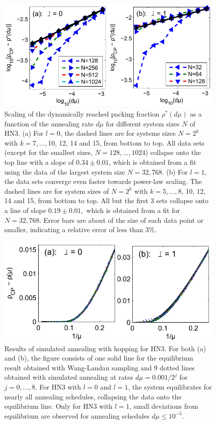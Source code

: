 \begin{figure}
\centering \includegraphics[width=0.9\columnwidth]{Chapter-2/Paper_HN3_Decay}
\protect\caption{Scaling of the dynamically reached packing fraction $\rho^{*}(d\mu)$
as a function of the annealing rate $d\mu$ for different system sizes
$N$ of HN3. (a) For $l=0$, the dashed lines are for systems sizes
$N=2^{k}$ with $k=7,\ldots,$10, 12, 14 and 15, from bottom to top.
All data sets (except for the smallest sizes, $N=128,\ldots,1024$)
collapse onto the top line with a slope of $0.34\pm0.01$, which is
obtained from a fit using the data of the largest system size $N=32,768$.
(b) For $l=1$, the data sets converge even faster towards power-law
scaling. The dashed lines are for system sizes of $N=2^{k}$ with
$k=5,\ldots,8$, 10, 12, 14 and 15, from bottom to top. All but the
first 3 sets collapse onto a line of slope $0.19\pm0.01,$ which is
obtained from a fit for $N=32,768$. Error bars are about of the size
of each data point or smaller, indicating a relative error of less
than $3\%$.}
\label{fig:HN3Decay} 
\end{figure}


\begin{figure}
\centering \includegraphics[width=0.9\columnwidth]{Chapter-2/Paper_HN3_Hopping_Plot}
\protect\caption{\label{fig:HN3hopping} 
Results of simulated annealing with hopping for HN3. For both (a)
and (b), the figure consists of one solid line for the equilibrium
result obtained with Wang-Landau sampling and 9 dotted lines obtained
with simulated annealing at rates $d\mu=0.001/2^{j}$ for $j=0,\ldots,8$.
For HN3 with $l=0$ and $l=1$, the system equilibrates for nearly
all annealing schedules, collapsing the data onto the equilibrium
line. Only for HN3 with $l=1$, small deviations from equilibrium
are observed for annealing schedules $d\mu \le10^{-5}$. } 
\end{figure}



